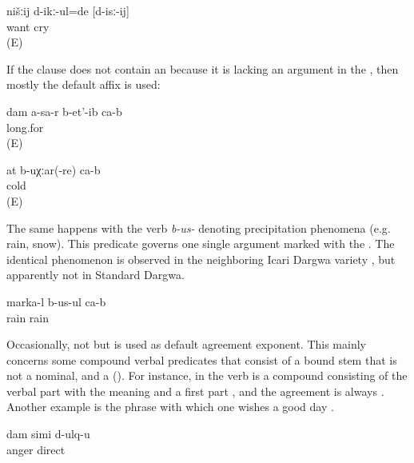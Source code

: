 %
\begin{exe}
		\ex	\label{ex:We wanted to cry@14c}
		\gll	nišːij	d-ikː-ul=de	[d-isː-ij]\\
				want	cry\\
		\glt	{} (E)
\end{exe}

If the clause does not contain an  because it is lacking an argument in the , then mostly the default affix  is used:
%
\begin{exe}
	\ex	\label{ex:I miss you@7}
	\gll	dam	a-sa-r	b-et'-ib ca-b\\
				long.for \\
	\glt	{} (E)

	\ex	\label{ex:You are cold@3a}
	\gll	at 	b-uχːar(-re)	ca-b\\
			cold	\\
	\glt	{} (E)
\end{exe}

The same happens with the verb \textit{b-us-} denoting precipitation phenomena (e.g. rain, snow). This predicate governs one single argument marked with the  . The identical phenomenon is observed in the neighboring Icari Dargwa variety \citep[155]{Sumbatova.Mutalov2003}, but apparently not in Standard Dargwa.
%
\begin{exe}
	\ex	\label{ex:It is raining@4}
	\gll	marka-l	b-us-ul	ca-b\\
		rain	rain \\
	\glt	{}
\end{exe}

Occasionally, not  but  is used as default agreement exponent. This mainly concerns some compound verbal predicates that consist of a bound stem that is not a nominal, and a  (). For instance, in  the verb is a compound consisting of the verbal part  with the meaning  and a first part , and the agreement is always . Another example is the phrase with which one wishes a good day .
%
\begin{exe}
	\ex	\label{ex:I am angry@b}
	\gll	dam	simi	d-ulq-u\\
			anger	direct\\
	\glt	{}
\end{exe}

